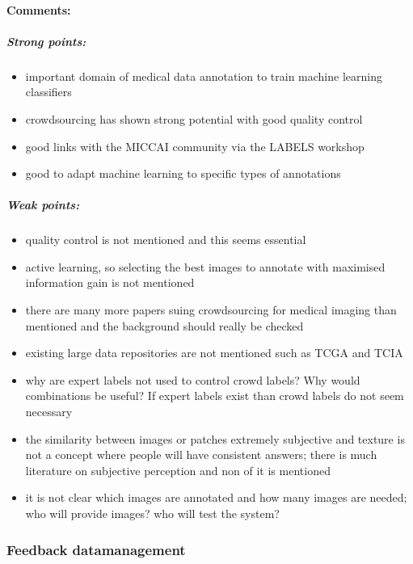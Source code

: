 \documentclass[serif, twocolumn, numeric, rga]{jote-article}
\begin{document}
\paragraph{Comments:}
\subparagraph{Strong points:}
\begin{itemize}
\item important domain of medical data annotation to train machine learning classifiers

\item crowdsourcing has shown strong potential with good quality control

\item good links with the MICCAI community via the LABELS workshop

\item good to adapt machine learning to specific types of annotations
\end{itemize}

\subparagraph{Weak points:} 
\begin{itemize}
    \item  quality control is not mentioned and this seems essential

\item active learning, so selecting the best images to annotate with maximised information gain is not mentioned

\item there are many more papers suing crowdsourcing for medical imaging than mentioned and the background should really be checked

\item existing large data repositories are not mentioned such as TCGA and TCIA

\item why are expert labels not used to control crowd labels? Why would combinations be useful? If expert labels exist than crowd labels do not seem necessary

\item the similarity between images or patches extremely subjective and texture is not a concept where people will have consistent answers; there is much literature on subjective perception and non of it is mentioned

\item it is not clear which images are annotated and how many images are needed; who will provide images? who will test the system?
\end{itemize}
 {}\subsubsection*{Feedback datamanagement} 
\end{document}
